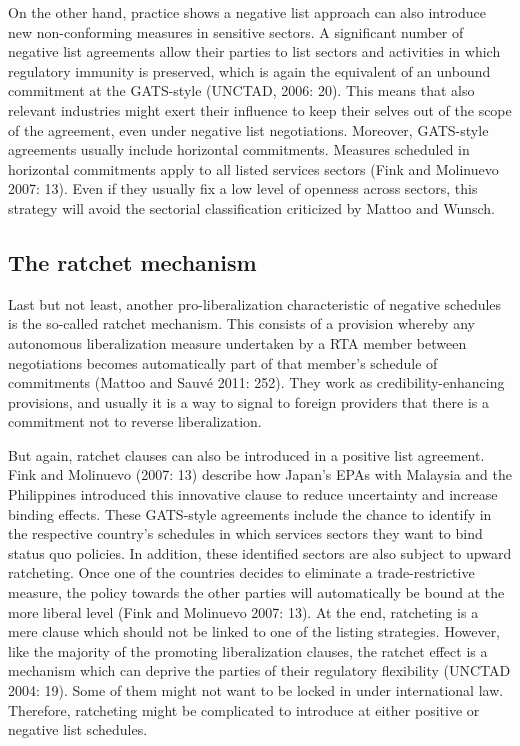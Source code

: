\documentclass{article}
\begin{document}
\smallskip

On the other hand, practice shows a negative list approach can also introduce new non-conforming measures in sensitive sectors. A significant number of negative list agreements allow their parties to list sectors and activities in which regulatory immunity is preserved, which is again the equivalent of an unbound commitment at the GATS-style (UNCTAD, 2006: 20). This means that also relevant industries might exert their influence to keep their selves out of the scope of the agreement, even under negative list negotiations. Moreover, GATS-style agreements usually include horizontal commitments. Measures scheduled in horizontal commitments apply to all listed services sectors (Fink and Molinuevo 2007: 13). Even if they usually fix a low level of openness across sectors, this strategy will avoid the sectorial classification criticized by Mattoo and Wunsch.

\subsection{The ratchet mechanism}

Last but not least, another pro-liberalization characteristic of negative schedules is the so-called ratchet mechanism. This consists of a provision whereby any autonomous liberalization measure undertaken by a RTA member between negotiations becomes automatically part of that member’s schedule of commitments (Mattoo and Sauvé 2011: 252). They work as credibility-enhancing provisions, and usually it is a way to signal to foreign providers that there is a commitment not to reverse liberalization.

\smallskip

But again, ratchet clauses can also be introduced in a positive list agreement. Fink and Molinuevo (2007: 13) describe how Japan’s EPAs with Malaysia and the Philippines introduced this innovative clause to reduce uncertainty and increase binding effects. These GATS-style agreements include the chance to identify in the respective country’s schedules in which services sectors they want to bind status quo policies. In addition, these identified sectors are also subject to upward ratcheting. Once one of the countries decides to eliminate a trade-restrictive measure, the policy towards the other parties will automatically be bound at the more liberal level (Fink and Molinuevo 2007: 13). At the end, ratcheting is a mere clause which should not be linked to one of the listing strategies. However, like the majority of the promoting liberalization clauses, the ratchet effect is a mechanism which can deprive the parties of their regulatory flexibility (UNCTAD 2004: 19). Some of them might not want to be locked in under international law. Therefore, ratcheting might be complicated to introduce at either positive or negative list schedules.
\end{document}
